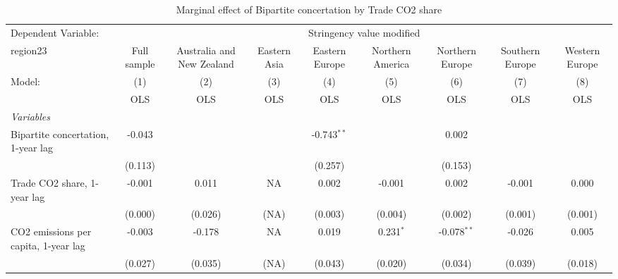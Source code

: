 
\begin{table}[htbp]
   \caption{Marginal effect of Bipartite concertation by Trade CO2 share}
   \centering
   \begin{tabular}{lcccccccc}
      \toprule
      Dependent Variable: & \multicolumn{8}{c}{Stringency value modified}\\
      region23                                                         & Full sample   & Australia and New Zealand & Eastern Asia & Eastern Europe & Northern America & Northern Europe & Southern Europe & Western Europe \\   
      Model:                                                           & (1)           & (2)                       & (3)          & (4)            & (5)              & (6)             & (7)             & (8)\\  
                                                                       &  OLS          & OLS                       & OLS          & OLS            & OLS              & OLS             & OLS             & OLS\\  
      \midrule
      \emph{Variables}\\
      Bipartite concertation, 1-year lag                               & -0.043        &                           &              & -0.743$^{**}$  &                  & 0.002           &                 &   \\   
                                                                       & (0.113)       &                           &              & (0.257)        &                  & (0.153)         &                 &   \\   
      Trade CO2 share, 1-year lag                                      & -0.001        & 0.011                     & NA           & 0.002          & -0.001           & 0.002           & -0.001          & 0.000\\   
                                                                       & (0.000)       & (0.026)                   & (NA)         & (0.003)        & (0.004)          & (0.002)         & (0.001)         & (0.001)\\   
      CO2 emissions per capita, 1-year lag                             & -0.003        & -0.178                    & NA           & 0.019          & 0.231$^{*}$      & -0.078$^{**}$   & -0.026          & 0.005\\   
                                                                       & (0.027)       & (0.035)                   & (NA)         & (0.043)        & (0.020)          & (0.034)         & (0.039)         & (0.018)\\   

\end{tabular}
\end{table}
